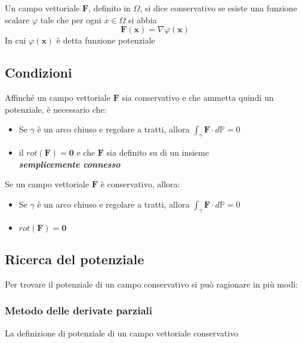 \documentclass[10pt,a4paper]{report}
\begin{document}
			Un campo vettoriale $ \mathbf{F} $, definito in $ \Omega $, si dice conservativo se 
			esiste una funzione scalare $ \varphi $ tale che per ogni $ x \in \Omega $ si abbia \[ \mathbf{F}(\mathbf{x}) = \nabla \varphi(\mathbf{x})\] In cui $ \varphi(\mathbf{x}) $ è detta funzione potenziale
			
			\subsection*{Condizioni}
			Affinché un campo vettoriale $ \mathbf{F} $ sia conservativo e che ammetta quindi un potenziale, è necessario che:
			\begin{itemize}
				\item Se $ \gamma $ è un arco chiuso e regolare a tratti, allora $ \int_{\gamma } \mathbf{F} \cdot d\mathbb{P}  =  0$
				\item il $ rot(\mathbf{F}) = \textbf{0} $ e che $ \mathbf{F} $ sia definito su di un insieme \\ \textit{\textbf{semplicemente connesso}}
			\end{itemize}
			Se un campo vettoriale $ \mathbf{F} $ è conservativo, allora:
			\begin{itemize}
				\item Se $ \gamma $ è un arco chiuso e regolare a tratti, allora $ \int_{\gamma } \mathbf{F} \cdot d\mathbb{P}  =  0$
				\item $ rot(\mathbf{F}) = \textbf{0} $
			\end{itemize}
		
			\subsection*{Ricerca del potenziale}
			Per trovare il potenziale di un campo conservativo si può ragionare in più modi:

                \subsubsection{Metodo delle derivate parziali}
                La definizione di potenziale di un campo vettoriale conservativo 
				
\end{document}
